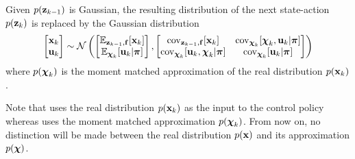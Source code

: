 \begin{ass}\label{ass:gauss}
Given $p(\mathbf{z}_{k-1})$ is Gaussian, the resulting distribution of the next state-action $p(\mathbf{z}_k)$ is replaced by the Gaussian distribution
\begin{equation*}
\begin{bmatrix} \mathbf{x}_k \\ \mathbf{u}_k \end{bmatrix} \sim \mathcal{N}\left(
\begin{bmatrix} \mathbb{E}_{\mathbf{z}_{k-1},\mathbf{f}}[\mathbf{x}_k] \\ \mathbb{E}_{\boldsymbol{\chi}_k}[\mathbf{u}_k|\boldsymbol{\pi}] \end{bmatrix},
\begin{bmatrix} \mathrm{cov}_{\mathbf{z}_{k-1},\mathbf{f}}[\mathbf{x}_k] & \mathrm{cov}_{\boldsymbol{\chi}_k}[\boldsymbol{\chi}_k,\mathbf{u}_k|\boldsymbol{\pi}] \\
\mathrm{cov}_{\boldsymbol{\chi}_k}[\mathbf{u}_k,\boldsymbol{\chi}_k|\boldsymbol{\pi}] & \mathrm{cov}_{\boldsymbol{\chi}_k}[\mathbf{u}_k|\boldsymbol{\pi}] \end{bmatrix}
\right)
\end{equation*}
where $p(\boldsymbol{\chi}_k)$ is the moment matched approximation of the real distribution $p(\mathbf{x}_k)$.
\end{ass}

Note that  uses the real distribution $p(\mathbf{x}_k)$ as the input to the control policy whereas  uses the moment matched approximation $p(\boldsymbol{\chi}_k)$. From now on, no distinction will be made between the real distribution $p(\mathbf{x})$ and its approximation $p(\boldsymbol{\chi})$.






